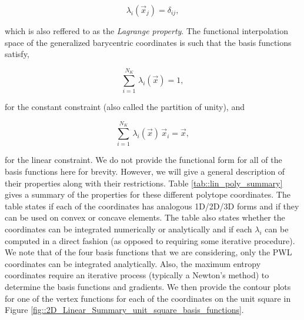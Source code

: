 \documentclass[11pt]{article}
\begin{document}
\begin{equation}
\label{eq::Lin_constant_constraint}
\lambda_i(\vec{x}_j) = \delta_{ij} ,
\end{equation}

\noindent which is also reffered to as the {\em Lagrange property}. The functional interpolation space of the generalized barycentric coordinates is such that the basis functions satisfy,

\begin{equation}
\label{eq::Lin_constant_constraint}
\sum_{i=1}^{N_K} \, \lambda_i(\vec{x}) = 1 ,
\end{equation}

\noindent for the constant constraint (also called the partition of unity), and 

\begin{equation}
\label{eq::Lin_linear_constraint}
\sum_{i=1}^{N_K} \,  \lambda_i(\vec{x}) \, \vec{x}_i  =\vec{x} ,
\end{equation}

\noindent for the linear constraint. We do not provide the functional form for all of the basis functions here for brevity. However, we will give a general description of their properties along with their restrictions. Table \ref{tab::lin_poly_summary} gives a summary of the properties for these different polytope coordinates. The table states if each of the coordinates has analogous 1D/2D/3D forms and if they can be used on convex or concave elements. The table also states whether the coordinates can be integrated numerically or analytically and if each $\lambda_i$ can be computed in a direct fashion (as opposed to requiring some iterative procedure). We note that of the four basis functions that we are considering, only the PWL coordinates can be integrated analytically. Also, the maximum entropy coordinates require an iterative process (typically a Newton's method) to determine the basis functions and gradients. We then provide the contour plots for one of the vertex functions for each of the coordinates on the unit square in Figure \ref{fig::2D_Linear_Summary_unit_square_basis_functions}.
\end{document}
